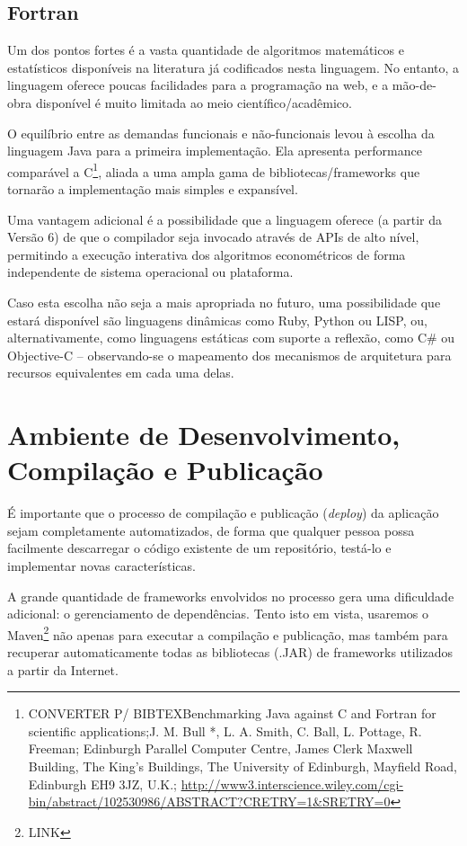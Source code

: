 \documentclass[11pt]{book}
\begin{document}
\subsection*{Fortran}
Um dos pontos fortes é a vasta quantidade de algoritmos matemáticos e estatísticos disponíveis na literatura já codificados nesta linguagem. No entanto, a linguagem oferece poucas facilidades para a programação na web, e a mão-de-obra disponível é muito limitada ao meio científico/acadêmico.

O equilíbrio entre as demandas funcionais e não-funcionais levou à escolha da linguagem Java para a primeira implementação. Ela apresenta performance comparável a C\footnote{CONVERTER P/ BIBTEXBenchmarking Java against C and Fortran for scientific applications;J. M. Bull *, L. A. Smith, C. Ball, L. Pottage, R. Freeman; Edinburgh Parallel Computer Centre, James Clerk Maxwell Building, The King's Buildings, The University of Edinburgh, Mayfield Road, Edinburgh EH9 3JZ, U.K.; \url{http://www3.interscience.wiley.com/cgi-bin/abstract/102530986/ABSTRACT?CRETRY=1&SRETRY=0}}, aliada a uma ampla gama de bibliotecas/frameworks que tornarão a implementação mais simples e expansível.

Uma vantagem adicional é a possibilidade que a linguagem oferece (a partir da Versão 6) de que o compilador seja invocado através de APIs de alto nível, permitindo a execução interativa dos algoritmos econométricos de forma independente de sistema operacional ou plataforma.

Caso esta escolha não seja a mais apropriada no futuro, uma possibilidade que estará disponível são  linguagens dinâmicas como Ruby, Python ou LISP, ou, alternativamente, como linguagens estáticas com suporte a reflexão, como C\# ou Objective-C – observando-se o mapeamento dos mecanismos de arquitetura para recursos equivalentes em cada uma delas.

\section{Ambiente de Desenvolvimento, Compilação e Publicação}

É importante que o processo de compilação e publicação (\textit{deploy}) da aplicação sejam completamente automatizados, de forma que qualquer pessoa possa facilmente descarregar o código existente de um repositório, testá-lo e implementar novas características.

A grande quantidade de frameworks envolvidos no processo gera uma dificuldade adicional: o gerenciamento de dependências. Tento isto em vista, usaremos o Maven\footnote{LINK} não apenas para executar a compilação e publicação, mas também para recuperar automaticamente todas as bibliotecas (.JAR) de frameworks utilizados a partir da Internet.
\end{document}
